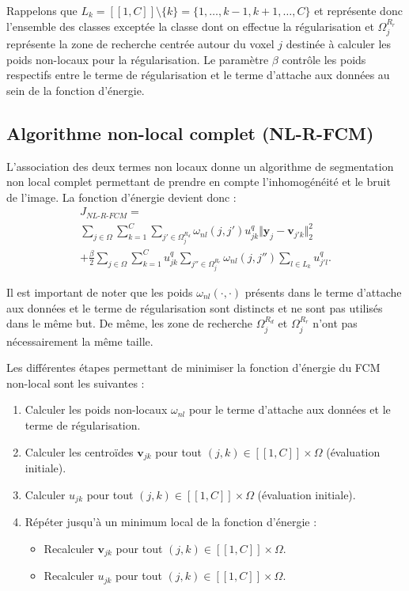Rappelons que $L_{k}=[\![1,C]\!]\setminus \{k\} = \{1, \ldots, k-1, k+1, \ldots, C\}$ et représente donc l'ensemble des classes exceptée la classe dont on effectue la régularisation et $\Omega^{R_{r}}_{j}$ représente la zone de recherche centrée autour du voxel $j$ destinée à calculer les poids non-locaux pour la régularisation.
Le paramètre $\beta$ contrôle les poids respectifs entre le terme de régularisation et le terme d'attache aux données au sein de la fonction d'énergie.

\subsection{Algorithme non-local complet (NL-R-FCM)}

L'association des deux termes non locaux donne un algorithme de segmentation non local complet permettant de prendre en compte l'inhomogénéité et le bruit de l'image. 
La fonction d'énergie devient donc : 
\begin{equation}
\begin{split}
J_{NL\textrm{-}R\textrm{-}FCM} =\\
\sum_{j \in \Omega} \sum_{k=1}^{C} \sum_{j' \in \Omega^{R_d}_{j}} \omega_{nl}(j, j') u_{jk}^{q} \Vert \mathbf{y}_{j} - \mathbf{v}_{j'k} \Vert_2^{2} \\
+ \frac{\beta}{2} \sum_{j \in \Omega} \sum_{k=1}^{C} u_{jk}^{q} \sum_{j'' \in \Omega^{R_{r}}_{j}} \omega_{nl}(j, j'') \sum_{l \in L_{k}} u_{j'l}^{q} \label{eq:nlfcm:reg}.
\end{split}
\end{equation}

Il est important de noter que les poids $\omega_{nl}(\cdot,\cdot)$ présents dans le terme d'attache aux données et le terme de régularisation sont distincts et ne sont pas utilisés dans le même but.
De même, les zone de recherche $\Omega^{R_d}_{j}$ et $\Omega^{R_r}_{j}$ n'ont pas nécessairement la même taille.

Les différentes étapes permettant de minimiser la fonction d'énergie du FCM non-local sont les suivantes : 
\begin{enumerate}
\item Calculer les poids non-locaux $\omega_{nl}$ pour le terme d'attache aux données et le terme de régularisation.
\item Calculer les centroïdes $\mathbf{v}_{jk}$ pour tout $(j,k) \in [\![ 1,C ]\!]\times \Omega$ (évaluation initiale).
\item Calculer $u_{jk}$ pour tout $(j,k) \in [\![ 1,C ]\!]\times \Omega$ (évaluation initiale).
\item Répéter jusqu'à un minimum local de la fonction d'énergie : 
\begin{itemize}
\item Recalculer $\mathbf{v}_{jk}$ pour tout $(j,k) \in [\![ 1,C ]\!]\times \Omega$.
\item Recalculer $u_{jk}$ pour tout $(j,k) \in [\![ 1,C ]\!]\times \Omega$.
\end{itemize}

\end{enumerate}

